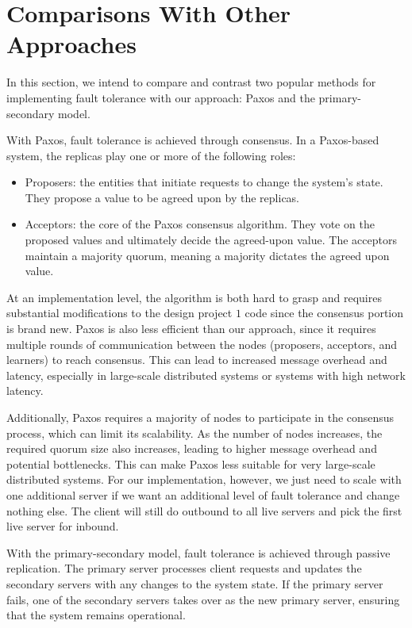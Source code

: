 \documentclass[
	a4paper, %
	10pt, %
	unnumberedsections, %
	twoside, %
]{LTJournalArticle}
\begin{document}
\section{Comparisons With Other Approaches}

In this section, we intend to compare and contrast two popular methods for implementing fault tolerance with our approach: Paxos and the primary-secondary model. 

With Paxos, fault tolerance is achieved through consensus. In a Paxos-based system, the replicas play one or more of the following roles:

\begin{itemize}
    \item Proposers: the entities that initiate requests to change the system's state. They propose a value to be agreed upon by the replicas. 
    \item Acceptors: the core of the Paxos consensus algorithm. They vote on the proposed values and ultimately decide the agreed-upon value. The acceptors maintain a majority quorum, meaning a majority dictates the agreed upon value. 
\end{itemize}

At an implementation level, the algorithm is both hard to grasp and requires substantial modifications to the design project $1$ code since the consensus portion is brand new. Paxos is also less efficient than our approach, since it requires multiple rounds of communication between the nodes (proposers, acceptors, and learners) to reach consensus. This can lead to increased message overhead and latency, especially in large-scale distributed systems or systems with high network latency. 

Additionally, Paxos requires a majority of nodes to participate in the consensus process, which can limit its scalability. As the number of nodes increases, the required quorum size also increases, leading to higher message overhead and potential bottlenecks. This can make Paxos less suitable for very large-scale distributed systems. For our implementation, however, we just need to scale with one additional server if we want an additional level of fault tolerance and change nothing else. The client will still do outbound to all live servers and pick the first live server for inbound. 

With the primary-secondary model, fault tolerance is achieved through passive replication. The primary server processes client requests and updates the secondary servers with any changes to the system state. If the primary server fails, one of the secondary servers takes over as the new primary server, ensuring that the system remains operational.
\end{document}
